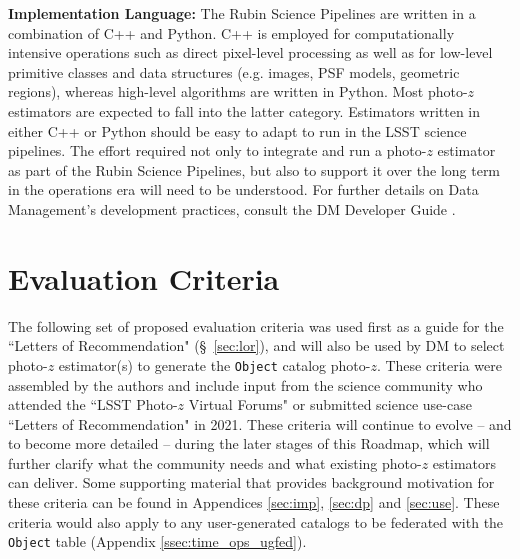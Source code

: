 \documentclass[DM,authoryear,toc]{lsstdoc}
\begin{document}
\textbf{Implementation Language:}
The Rubin Science Pipelines are written in a combination of C++ and Python. 
C++ is employed for computationally intensive operations such as direct pixel-level processing as well as for low-level primitive classes and data structures (e.g. images, PSF models, geometric regions), whereas high-level algorithms are written in Python. 
Most photo-$z$ estimators are expected to fall into the latter category.
Estimators written in either C++ or Python should be easy to adapt to run in the LSST science pipelines. 
The effort required not only to integrate and run a photo-$z$ estimator as part of the Rubin Science Pipelines, but also to support it over the long term in the operations era will need to be understood. 
For further details on Data Management's development practices, consult the DM Developer Guide \cite{DevGuide}.


\section{Evaluation Criteria} \label{sec:eval}

The following set of proposed evaluation criteria was used first as a guide for the ``Letters of Recommendation" (\S~\ref{sec:lor}), and will also be used by DM to select photo-$z$ estimator(s) to generate the {\tt Object} catalog photo-$z$.
These criteria were assembled by the authors and include input from the science community who attended the ``LSST Photo-$z$ Virtual Forums" or submitted science use-case ``Letters of Recommendation" in 2021.
These criteria will continue to evolve -- and to become more detailed -- during the later stages of this Roadmap, which will further clarify what the community needs and what existing photo-$z$ estimators can deliver.
Some supporting material that provides background motivation for these criteria can be found in Appendices \ref{sec:imp}, \ref{sec:dp} and \ref{sec:use}.
These criteria would also apply to any user-generated catalogs to be federated with the {\tt Object} table (Appendix \ref{ssec:time_ops_ugfed}).
\end{document}
